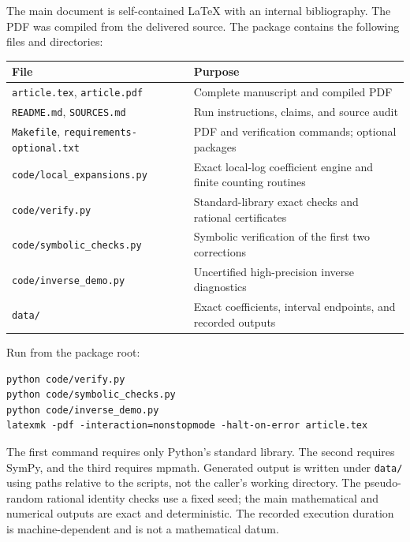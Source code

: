 \documentclass[11pt]{article}
\numberwithin{equation}{section}
\theoremstyle{definition}
\theoremstyle{remark}
\theoremstyle{definition}
\begin{document}
The main document is self-contained LaTeX with an internal bibliography.
The PDF was compiled from the delivered source. The package contains the
following files and directories:
\begin{center}\small
\begin{tabular}{@{}p{}p{}@{}}
\toprule
File & Purpose\\
\midrule
\texttt{article.tex}, \texttt{article.pdf} & Complete manuscript and compiled PDF\\
\texttt{README.md}, \texttt{SOURCES.md} & Run instructions, claims, and source audit\\
\texttt{Makefile}, \texttt{requirements-optional.txt} & PDF and verification commands; optional packages\\
\texttt{code/local\_expansions.py} & Exact local-log coefficient engine and finite counting routines\\
\texttt{code/verify.py} & Standard-library exact checks and rational certificates\\
\texttt{code/symbolic\_checks.py} & Symbolic verification of the first two corrections\\
\texttt{code/inverse\_demo.py} & Uncertified high-precision inverse diagnostics\\
\texttt{data/} & Exact coefficients, interval endpoints, and recorded outputs\\
\bottomrule
\end{tabular}
\end{center}
Run from the package root:
\begin{verbatim}
python code/verify.py
python code/symbolic_checks.py
python code/inverse_demo.py
latexmk -pdf -interaction=nonstopmode -halt-on-error article.tex
\end{verbatim}
The first command requires only Python's standard library. The second
requires SymPy, and the third requires mpmath. Generated output is written
under \texttt{data/} using paths relative to the scripts, not the caller's
working directory. The pseudo-random rational identity checks use a
fixed seed; the main mathematical and numerical outputs are exact and
deterministic. The recorded execution duration is machine-dependent and
is not a mathematical datum.
\end{document}
